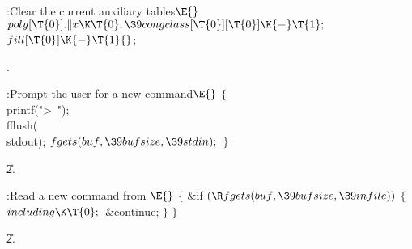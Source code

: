 \Y\B\4:Clear the current auxiliary tables\X${}\E{}$\6
$\\{poly}[\T{0}].\|x\K\T{0},\39\\{congclass}[\T{0}][\T{0}]\K{-}\T{1};{}$\6
${}\\{fill}[\T{0}]\K{-}\T{1}{}$;\par
{}.\fi

\B{}:Prompt the user for a new command\X${}\E{}$\6
${}\{{}$\1\6
\\{printf}(\.{">\ "});\5
\\{fflush}(\\{stdout});\6
${}\\{fgets}(\\{buf},\39\\{bufsize},\39\\{stdin});{}$\6
\4${}\}{}$\2\par
\U2.\fi

\B{}:Read a new command from \X${}\E{}$\6
${}\{{}$\1\6
\&{if} ${}(\R\\{fgets}(\\{buf},\39\\{bufsize},\39\\{infile})){}$\5
${}\{{}$\1\6
${}\\{including}\K\T{0};{}$\6
\&{continue};\6
\4${}\}{}$\2\6
\4${}\}{}$\2\par
\U2.\fi

